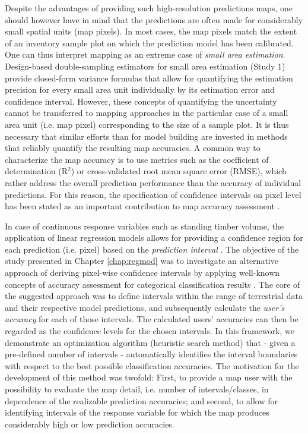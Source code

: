Despite the advantages of providing such high-resolution predictions maps, one should however have in mind that the predictions are often made for considerably small spatial units (map pixels). In most cases, the map pixels match the extent of an inventory sample plot on which the prediction model has been calibrated. One can thus interpret mapping as an extreme case of \textit{small area estimation}. Design-based double-sampling estimators for small area estimation (Study 1) provide closed-form variance formulas that allow for quantifying the estimation precision for every small area unit individually by its estimation error and confidence interval. However, these concepts of quantifying the uncertainty cannot be transferred to mapping approaches in the particular case of a small area unit (i.e. map pixel) corresponding to the size of a sample plot. It is thus necessary that similar efforts than for model building are invested in methods that reliably quantify the resulting map accuracies. A common way to characterize the map accuracy is to use metrics such as the coefficient of determination (R$^2$) or cross-validated root mean square error (RMSE), which rather address the overall prediction performance than the accuracy of individual predictions. For this reason, the specification of confidence intervals on pixel level has been stated as an important contribution to map accuracy assessment \citep{mcroberts2010a}.\par

In case of continuous response variables such as standing timber volume, the application of linear regression models allows for providing a confidence region for each prediction (i.e. pixel) based on the \textit{prediction interval} \citep[pp.136--139]{fahrmeir2013}. The objective of the study presented in Chapter \ref{chap:regmod} was to investigate an alternative approach of deriving pixel-wise confidence intervals by applying well-known concepts of accuracy assessment for categorical classification results \citep{congalton2008}. The core of the suggested approach was to define intervals within the range of terrestrial data and their respective model predictions, and subsequently calculate the \textit{user's accuracy} for each of those intervals. The calculated users' accuracies can then be regarded as the confidence levels for the chosen intervals. In this framework, we demonstrate an optimization algorithm (heuristic search method) that - given a pre-defined number of intervals - automatically identifies the interval boundaries with respect to the best possible classification accuracies. The motivation for the development of this method was twofold: First, to provide a map user with the possibility to evaluate the map detail, i.e. number of intervals/classes, in dependence of the realizable prediction accuracies; and second, to allow for identifying intervals of the response variable for which the map produces considerably high or low prediction accuracies.\par 

